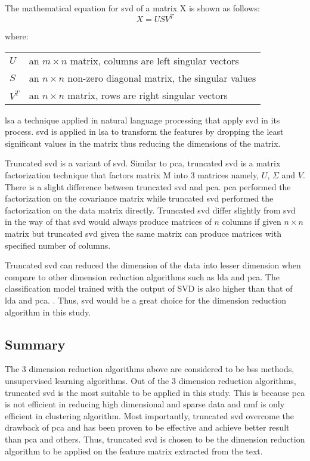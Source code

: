 The mathematical equation for \ac{svd} of a matrix X is shown as follows:
\begin{equation}
X = USV^{T}
\end{equation}

where:
\begin{center}
	\begin{tabular}{l @{ $=$ } l}
		$U$ & an $m \times n$ matrix, columns are left singular vectors \\
		$S$ & an $n \times n$ non-zero diagonal matrix, the singular values \\
		$V^{T}$ & an $n \times n$ matrix, rows are right singular vectors \\
	\end{tabular}
\end{center}

	
\Ac{lsa} a technique applied in natural language processing that apply \ac{svd} in its process. \Ac{svd} is applied in \ac{lsa} to transform the features by dropping the least significant values in the matrix thus reducing the dimensions of the matrix. \cite{fuzzyLash}

Truncated \ac{svd} is a variant of \ac{svd}. Similar to \ac{pca}, truncated \ac{svd} is a matrix factorization technique that factors matrix M into 3 matrices namely, $U$, $\Sigma$ and $V$. There is a slight difference between truncated \ac{svd} and \ac{pca}. \Ac{pca} performed the factorization on the covariance matrix while truncated \ac{svd} performed the factorization on the data matrix directly. Truncated \ac{svd} differ slightly from \ac{svd} in the way of that \ac{svd} would always produce matrices of $n$ columns if given $n \times n$ matrix but truncated \ac{svd} given the same matrix can produce matrices with specified number of columns. \cite{truncatedSVD}

Truncated \ac{svd} can reduced the dimension of the data into lesser dimension when compare to other dimension reduction algorithms such as \ac{lda} and \ac{pca}. The classification model trained with the output of SVD is also higher than that of \ac{lda} and \ac{pca}. \cite{dimRedCat}. Thus, \ac{svd} would be a great choice for the dimension reduction algorithm in this study.\\
	
\subsection{Summary}
The 3 dimension reduction algorithms above are considered to be \ac{bss} methods, unsupervised learning algorithms. Out of the 3 dimension reduction algorithms, truncated \ac{svd} is the most suitable to be applied in this study. This is because \ac{pca} is not efficient in reducing high dimensional and sparse data and \ac{nmf} is only efficient in clustering algorithm. Most importantly, truncated \ac{svd} overcome the drawback of \ac{pca} and has been proven to be effective and achieve better result than \ac{pca} and others. Thus, truncated \ac{svd} is chosen to be the dimension reduction algorithm to be applied on the feature matrix extracted from the text.\\

